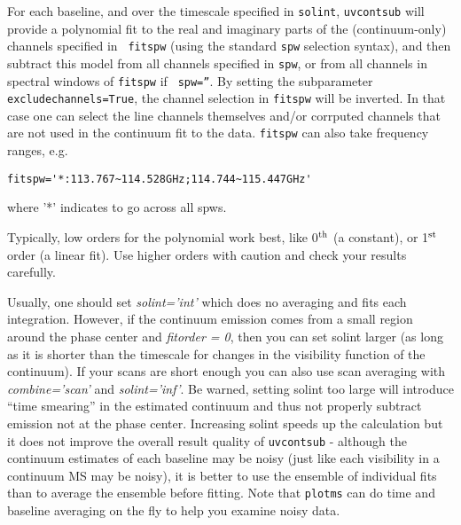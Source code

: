 For each baseline, and over the timescale specified in {\tt solint},
{\tt uvcontsub} will provide a polynomial fit to the real and
imaginary parts of the (continuum-only) channels specified in {\tt
fitspw} (using the standard {\tt spw} selection syntax), 
and then subtract this model from all channels specified in {\tt spw}, or
from all channels in spectral windows of {\tt fitspw} if {\tt
  spw=''}. By setting the subparameter {\tt excludechannels=True}, the
channel selection in {\tt fitspw} will be inverted. In that case one
can select the line channels themselves and/or corrputed channels that
are not used in the continuum fit to the data. {\tt fitspw} can also
take frequency ranges, e.g. 

\small
\begin{verbatim}
fitspw='*:113.767~114.528GHz;114.744~115.447GHz'
\end{verbatim}
\normalsize

where '*' indicates to go across all spws. 


Typically, low orders for the polynomial work best, like 0$^{\rm th}$ (a
constant), or 1$^{\rm st}$ order (a linear fit). Use higher orders with caution
and check your results carefully.

Usually, one should set {\it solint='int'} which does no averaging and fits
each integration. However, if the continuum emission comes from a small
region around the phase center and {\it fitorder = 0}, then you can set solint
larger (as long as it is shorter than the timescale for changes in the
visibility function of the continuum).  If your scans are short enough you
can also use scan averaging with {\it combine='scan'} and {\it solint='inf'}. 
Be warned, setting solint too
large will introduce ``time smearing'' in the estimated continuum and thus
not properly subtract emission not at the phase center.  Increasing solint
speeds up the calculation but it does not improve the overall result
quality of {\tt uvcontsub} - although the continuum estimates of each baseline
may be noisy (just like each visibility in a continuum MS may be noisy),
it is better to use the ensemble of individual fits than to average the
ensemble before fitting.  Note that {\tt plotms} can do time and baseline
averaging on the fly to help you examine noisy data.


